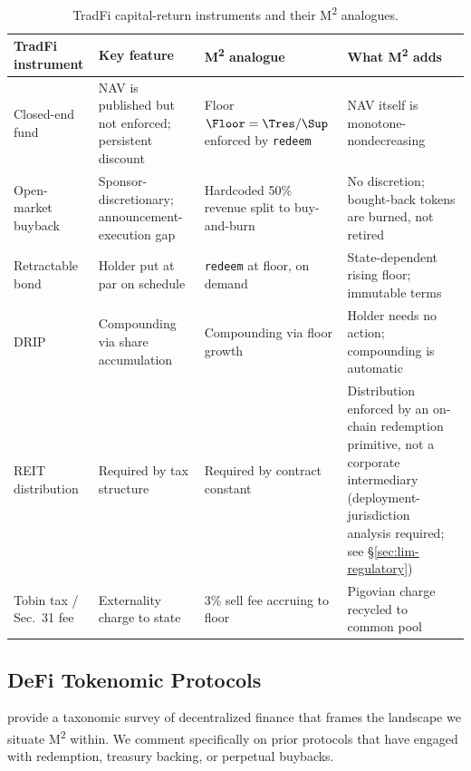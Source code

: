 \begin{table}[t]
\centering
\small
\caption{TradFi capital-return instruments and their M\textsuperscript{2} analogues.}
\label{tab:tradfi-analogues}
\setlength{\tabcolsep}{4pt}
\begin{tabular}{p{2.6cm} p{4.2cm} p{4.4cm} p{3.4cm}}
\toprule
\textbf{TradFi instrument} & \textbf{Key feature} & \textbf{M\textsuperscript{2} analogue} & \textbf{What M\textsuperscript{2} adds} \\
\midrule
Closed-end fund & NAV is published but not enforced; persistent discount & Floor $\Floor = \Tres/\Sup$ enforced by \texttt{redeem} & NAV itself is monotone-nondecreasing \\
Open-market buyback & Sponsor-discretionary; announcement-execution gap & Hardcoded 50\% revenue split to buy-and-burn & No discretion; bought-back tokens are burned, not retired \\
Retractable bond & Holder put at par on schedule & \texttt{redeem} at floor, on demand & State-dependent rising floor; immutable terms \\
DRIP & Compounding via share accumulation & Compounding via floor growth & Holder needs no action; compounding is automatic \\
REIT distribution & Required by tax structure & Required by contract constant & Distribution enforced by an on-chain redemption primitive, not a corporate intermediary (deployment-jurisdiction analysis required; see \S\ref{sec:lim-regulatory}) \\
Tobin tax / Sec.\ 31 fee & Externality charge to state & 3\% sell fee accruing to floor & Pigovian charge recycled to common pool \\
\bottomrule
\end{tabular}
\end{table}

\subsection{DeFi Tokenomic Protocols}
\label{sec:related-defi}

\citet{Werner2022SoK} provide a taxonomic survey of decentralized finance that frames the landscape we situate M\textsuperscript{2} within. We comment specifically on prior protocols that have engaged with redemption, treasury backing, or perpetual buybacks.

